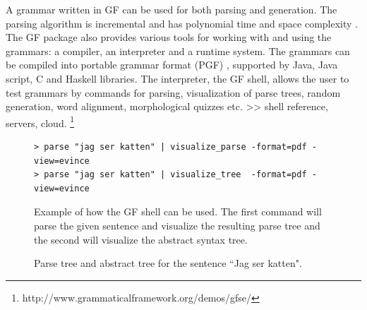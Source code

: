 \documentclass{report}
\begin{document}
A grammar written in GF can be used for both parsing and generation.
The parsing algorithm is incremental and has polynomial time and space
complexity \cite{gfMech}. 
The GF package also provides various tools for working with and using the grammars:
a compiler, an interpreter and a runtime system.
The grammars can be compiled into portable grammar format (PGF) \cite{pgf},
supported by %
Java, Java script, C and Haskell libraries. 
The interpreter, the GF shell, allows
the user to test grammars by commands for parsing, visualization of parse trees,
random generation, word alignment, morphological quizzes etc.
>> shell reference, servers, cloud. \footnote{http://www.grammaticalframework.org/demos/gfse/}
\begin{figure}[h]
\begin{verbatim} 
> parse "jag ser katten" | visualize_parse -format=pdf -view=evince
> parse "jag ser katten" | visualize_tree  -format=pdf -view=evince
\end{verbatim}
\caption{Example of how the GF shell can be used. The first command will parse the given
sentence and visualize the resulting parse tree and the second will visualize the 
abstract syntax tree.}
\label{fig:shellvp}
\end{figure}
\begin{figure}[h]
\centering
{}
\caption{Parse tree and abstract tree for the sentence ``Jag ser katten".}
\label{fig:gftree1}
\end{figure}
\end{document}
